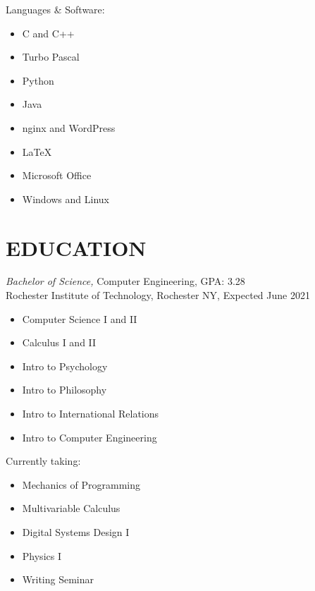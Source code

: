 \documentclass[line,margin]{res}
\begin{document}
\begin{resume}
\begin{multicols}{2}
\begin{itemize}
			\end{itemize}
		\end{multicols}	
	\vspace{-8pt}
	{Languages \& Software:} %
		\begin{multicols}{2}
			\begin{itemize}
				\itemsep -2pt
				\item[] C and C++
				\item[] Turbo Pascal
				\item[] Python
				\item[] Java
				\item[] nginx and WordPress
				\item[] \LaTeX
				\item[] Microsoft Office
				\item[] Windows and Linux
			\end{itemize}
		\end{multicols}

\section{EDUCATION} 
	{\sl Bachelor of Science,} Computer Engineering, GPA: 3.28\\
                Rochester Institute of Technology, Rochester NY, 
				Expected June 2021 %
				\begin{multicols}{2}
					\begin{itemize}
						\itemsep -2pt
						\item[] Computer Science I and II
						\item[] Calculus I and II
						\item[] Intro to Psychology
						\item[] Intro to Philosophy
						\item[] Intro to International Relations
						\item[] Intro to Computer Engineering						
					\end{itemize}
					Currently taking:
					\begin{itemize}
						\itemsep -2pt
						\item[] Mechanics of Programming
						\item[] Multivariable Calculus
						\item[] Digital Systems Design I
						\item[] Physics I
						\item[] Writing Seminar
					\end{itemize}
				\end{multicols}
 	

\end{resume}
\end{document}
